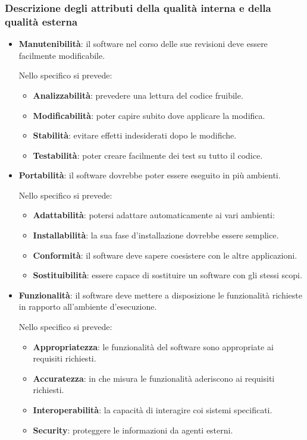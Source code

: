 		\subsubsection{Descrizione degli attributi della qualità interna e della qualità esterna}
		\begin{itemize}
			\item \textbf{Manutenibilità}: il software nel corso delle sue revisioni deve essere facilmente modificabile.
			
			Nello specifico si prevede:
			
			\begin{itemize}
				\item \textbf{Analizzabilità}: prevedere una lettura del codice fruibile.
				\item \textbf{Modificabilità}: poter capire subito dove applicare la modifica.
				\item \textbf{Stabilità}: evitare effetti indesiderati dopo le modifiche.
				\item \textbf{Testabilità}: poter creare facilmente dei test su tutto il codice.
			\end{itemize}
		
			\item \textbf{Portabilità}: il software dovrebbe poter essere eseguito in più ambienti.
			
			Nello specifico si prevede:
			
			\begin{itemize}
				\item \textbf{Adattabilità}: potersi adattare automaticamente ai vari ambienti:
				\item \textbf{Installabilità}: la sua fase d'installazione dovrebbe essere semplice.
				\item \textbf{Conformità}: il software deve sapere coesistere con le altre applicazioni.
				\item \textbf{Sostituibilità}: essere capace di sostituire un software con gli stessi scopi.
			\end{itemize}
		
			\item \textbf{Funzionalità}: il software deve mettere a disposizione le funzionalità richieste in rapporto all'ambiente d'esecuzione.
			
			Nello specifico si prevede:
			
			\begin{itemize}
				\item \textbf{Appropriatezza}: le funzionalità del software sono appropriate ai requisiti richiesti.
				\item \textbf{Accuratezza}: in che misura le funzionalità aderiscono ai requisiti richiesti.
				\item \textbf{Interoperabilità}: la capacità di interagire coi sistemi specificati.
				\item \textbf{Security}: proteggere le informazioni da agenti esterni.
			\end{itemize}
		

\end{itemize}
